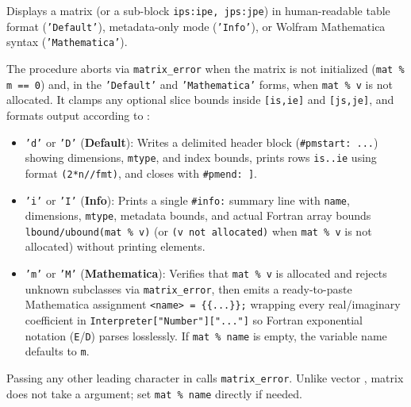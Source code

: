 Displays a matrix (or a sub-block \texttt{ips:ipe, jps:jpe}) in human-readable table format (\texttt{'Default'}), metadata-only mode (\texttt{'Info'}), or Wolfram Mathematica syntax (\texttt{'Mathematica'}).

The procedure aborts via \texttt{matrix\_error} when the matrix is not initialized (\texttt{mat \% m == 0}) and, in the \texttt{'Default'} and \texttt{'Mathematica'} forms, when \texttt{mat \% v} is not allocated. It clamps any optional slice bounds  inside \texttt{[is,ie]} and \texttt{[js,je]}, and formats output according to :
\begin{itemize}
  \item \texttt{'d'} or \texttt{'D'} (\textbf{Default}): Writes a delimited header block (\texttt{\#pmstart: ...}) showing dimensions, \texttt{mtype}, and index bounds, prints rows \texttt{is..ie} using format \texttt{(2*n//fmt)}, and closes with \texttt{\#pmend: ]}.
  \item \texttt{'i'} or \texttt{'I'} (\textbf{Info}): Prints a single \texttt{\#info:} summary line with \texttt{name}, dimensions, \texttt{mtype}, metadata bounds, and actual Fortran array bounds \texttt{lbound/ubound(mat \% v)} (or \texttt{(v not allocated)} when \texttt{mat \% v} is not allocated) without printing elements.
  \item \texttt{'m'} or \texttt{'M'} (\textbf{Mathematica}): Verifies that \texttt{mat \% v} is allocated and rejects unknown subclasses via \texttt{matrix\_error}, then emits a ready-to-paste Mathematica assignment \texttt{<name> = \{\{...\}\};} wrapping every real/imaginary coefficient in \texttt{Interpreter["Number"]["..."]} so Fortran exponential notation (\texttt{E}/\texttt{D}) parses losslessly. If \texttt{mat \% name} is empty, the variable name defaults to \texttt{m}.
\end{itemize}
Passing any other leading character in  calls \texttt{matrix\_error}. Unlike vector , matrix  does not take a  argument; set \texttt{mat \% name} directly if needed.

\begin{description}[leftmargin=2.2cm, style=nextline]
\end{description}


